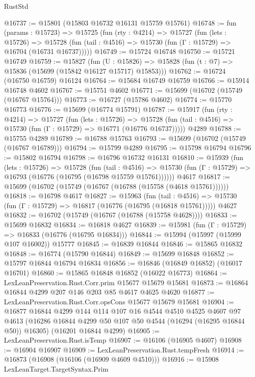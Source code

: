 \begin{lexlean}{RustStd}
\begin{coremodule}
@16737 := @15801 (@15803 @16732 @16131 @15759 @15761)
@16748 := fun (params : @15723) =>
  @15725
    (fun (rty : @4214) =>
    @15727
      (fun (lets : @15726) =>
      @15728 (fun (tail : @4516) => @15730 (fun (Γ : @15729) => @16704 (@16731 @16737)))))
@16749 := @15724 @16748
@16750 := @15721 @16749
@16759 := @15827
    (fun (U : @15826) => @15828 (fun (t : @7) => @15836 (@15699 (@15842 @16127 @15717) @15853)))
@16762 := @16724 (@16750 @16759) @16124
@16764 := @15684 @16749 @16759
@16766 := @15914 @16748 @4602
@16767 := @15751 @4602
@16771 := @15699 (@16702 (@15749 (@16767 @15764)))
@16773 := @16727 (@15786 @4602)
@16774 := @15770 @16773
@16776 := @15699 (@16774 @15791)
@16787 := @15917
    (fun (rty : @4214) =>
    @15727
      (fun (lets : @15726) =>
      @15728 (fun (tail : @4516) => @15730 (fun (Γ : @15729) => @16771 (@16776 @16737)))))
    @4289
@16788 := @15755 @4289
@16789 := @16788 @15763
@16793 := @15699 (@16702 (@15749 (@16767 @16789)))
@16794 := @15799 @4289
@16795 := @15798 @16794
@16796 := @15802 @16794
@16798 := @16796 @16732 @16131
@16810 := @15939
    (fun (lets : @15726) =>
    @15728
      (fun (tail : @4516) =>
      @15730 (fun (Γ : @15729) => @16793 (@16776 (@16795 (@16798 @15759 @15761))))))
    @4617
@16817 := @15699 (@16702 (@15749 (@16767 (@16788 (@15758 (@4618 @15761))))))
@16818 := @16798 @4617
@16827 := @15963
    (fun (tail : @4516) => @15730 (fun (Γ : @15729) => @16817 (@16776 (@16795 (@16818 @15761)))))
    @4627
@16832 := @16702 (@15749 (@16767 (@16788 (@15758 @4628))))
@16833 := @15699 @16832
@16834 := @16818 @4627
@16839 := @15981 (fun (Γ : @15729) => @16833 (@16776 (@16795 @16834)))
@16844 := @15994 (@15997 (@15999 @107 @16002)) @15777
@16845 := @16839 @16844
@16846 := @15865 @16832
@16848 := @16774 (@15790 @16844)
@16849 := @15699 @16848
@16852 := @15797 @16844 @16794 @16834
@16856 := @16846 (@16849 @16852) (@16017 @16701)
@16860 := @15865 @16848 @16852 (@16022 @16773)
@16864 := LexLeanPreservation.Rust.Corr.prim @15677 @15679 @15681
@16873 := @16864 @16844 @4299 @207 @146 @203 @85 @4617 @4625 @4620
@16877 := LexLeanPreservation.Rust.Corr.opsCons @15677 @15679 @15681
@16904 := @16877
    @16844
    @4299
    @144
    @114
    @107
    @16
    @4544
    @4510
    @4525
    @4607
    @97
    @4613
    (@16286 @16844 @4299 @50 @107 @50 @4544 (@16294 (@16295 @16844 @50)) @16305)
    (@16201 @16844 @4299)
@16905 := LexLeanPreservation.Rust.isTemp
@16907 := @16106 (@16905 @4607)
@16908 := @16904 @16907
@16909 := LexLeanPreservation.Rust.tempFresh
@16914 := @16873 (@16908 (@16106 (@16909 @4609 @4510)))
@16916 := @15908 LexLeanTarget.TargetSyntax.Prim

\end{coremodule}
\end{lexlean}
